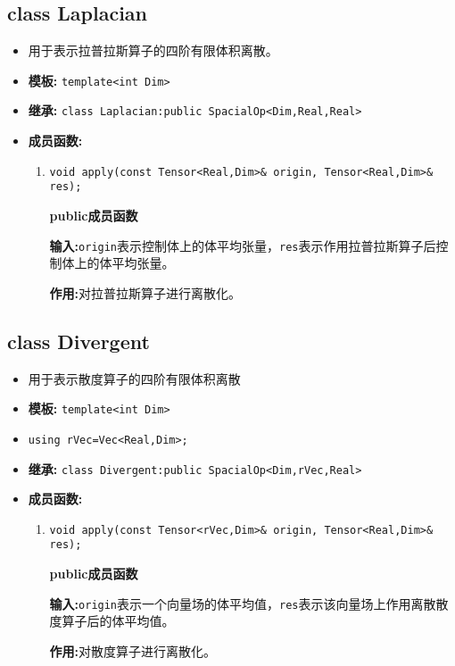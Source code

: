 \documentclass[UTF8]{ctexart}
\theoremstyle{plain}
\theoremstyle{definition}
\theoremstyle{remark}
\begin{document}
\subsection{class Laplacian}
\begin{itemize}
    \item 用于表示拉普拉斯算子的四阶有限体积离散。
    \item \textbf{模板:} \texttt{template<int Dim>}
    \item \textbf{继承:} \texttt{class Laplacian:public SpacialOp<Dim,Real,Real>}
    \item \textbf{成员函数:}
    \begin{enumerate}
        \item \texttt{void apply(const Tensor<Real,Dim>\& origin, Tensor<Real,Dim>\& res);}
        
        \textbf{public成员函数}

        \textbf{输入:}\texttt{origin}表示控制体上的体平均张量，\texttt{res}表示作用拉普拉斯算子后控制体上的体平均张量。

        \textbf{作用:}对拉普拉斯算子进行离散化。
    \end{enumerate}
\end{itemize}
\subsection{class Divergent}
\begin{itemize}
    \item 用于表示散度算子的四阶有限体积离散
    \item \textbf{模板:} \texttt{template<int Dim>}
    \item \texttt{using rVec=Vec<Real,Dim>;}
    \item \textbf{继承:} \texttt{class Divergent:public SpacialOp<Dim,rVec,Real>}
    \item \textbf{成员函数:} 
    \begin{enumerate}
        \item \texttt{void apply(const Tensor<rVec,Dim>\& origin, Tensor<Real,Dim>\& res);}
        
        \textbf{public成员函数}
        
        \textbf{输入:}\texttt{origin}表示一个向量场的体平均值，\texttt{res}表示该向量场上作用离散散度算子后的体平均值。

        \textbf{作用:}对散度算子进行离散化。
    \end{enumerate}
\end{itemize}
\end{document}
